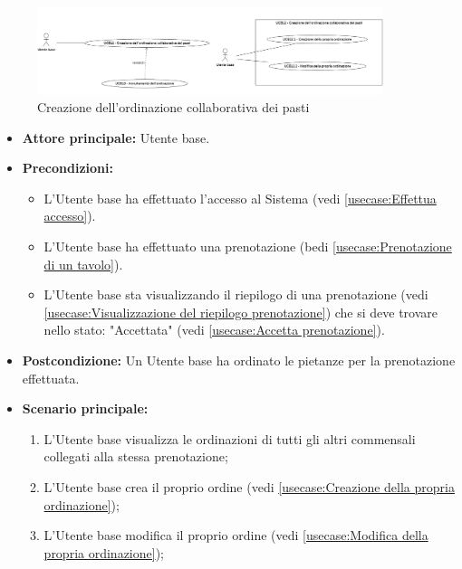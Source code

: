 \label{usecase:Creazione dell'ordinazione collaborativa dei pasti}

\begin{figure}[h]
	\centering
	\includegraphics[width=0.9\textwidth]{./uml/UCB12-13.png} 
	\caption{Creazione dell'ordinazione collaborativa dei pasti}
	\label{fig:UCB12-13}
  \end{figure}

\begin{itemize}
	\item \textbf{Attore principale:} Utente base.

	\item \textbf{Precondizioni:}
	      \begin{itemize}
		      \item L'Utente base ha effettuato l'accesso al Sistema (vedi \autoref{usecase:Effettua accesso}).
		      \item L'Utente base ha effettuato una prenotazione (bedi \autoref{usecase:Prenotazione di un tavolo}).
		      \item L'Utente base sta visualizzando il riepilogo di una prenotazione (vedi \autoref{usecase:Visualizzazione del riepilogo prenotazione}) che si deve trovare nello stato: "Accettata"  (vedi \autoref{usecase:Accetta prenotazione}).
	      \end{itemize}

	\item \textbf{Postcondizione:} Un Utente base ha ordinato le pietanze per la prenotazione effettuata.

	\item \textbf{Scenario principale:}
	      \begin{enumerate}
		      \item L'Utente base visualizza le ordinazioni di tutti gli altri commensali collegati alla stessa prenotazione;
		      \item L'Utente base crea il proprio ordine (vedi \autoref{usecase:Creazione della propria ordinazione});
		      \item L'Utente base modifica il proprio ordine (vedi \autoref{usecase:Modifica della propria ordinazione});


\end{enumerate}
\end{itemize}
